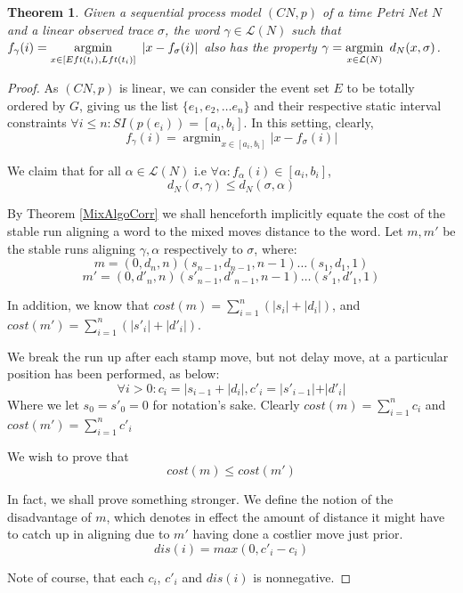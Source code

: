 \documentclass[conference]{IEEEtran}
\DeclareMathOperator*{\argmin}{argmin}
\newtheorem*{theorem*}{Theorem}
\begin{document}
\begin{theorem*}
	Given a sequential process model $(CN, p)$ of a time Petri Net $N$ and a linear observed trace $\sigma$, the word $\gamma \in \mathcal{L}(N)$ such that $f_{\gamma}(i)= \underset{x \in [Eft(t_i), Lft(t_i)]} {\argmin}\hspace{0.5em} {|x - f_\sigma(i)|}$ also has the property $\gamma = \underset{x \in \mathcal{L}(N)}{\argmin} \hspace{0.5em}{d_N(x, \sigma)}$. 
\end{theorem*}
\begin{proof}
As $(CN, p)$ is linear, we can consider the event set $E$ to be totally ordered by $G$, giving us the list $\{e_1, e_2, \dots e_n\}$ and their respective static interval constraints $\forall i \leq n : SI(p(e_i)) = [a_i, b_i]$. In this setting, clearly, $$f_{\gamma}(i)= \argmin_{x \in [a_i, b_i]} {|x - f_\sigma(i)|}$$

We claim that for all $\alpha \in \mathcal{L}(N)$ i.e $\forall \alpha : f_{\alpha}(i) \in [a_i, b_i]$, $$d_N(\sigma, \gamma) \leq d_N(\sigma, \alpha)$$

By Theorem \ref{MixAlgoCorr} we shall henceforth implicitly equate the cost of the stable run aligning a word to the mixed moves distance to the word. 
Let $m, m'$ be the stable runs aligning $\gamma, \alpha$ respectively to $\sigma$, where: 
$$m = (0, d_n, n)(s_{n-1}, d_{n-1}, n-1) \dots (s_1, d_1, 1)$$  
$$m' = (0, d'_n, n)(s'_{n-1}, d'_{n-1}, n-1) \dots (s'_1, d'_1, 1)$$ 

In addition, we know that $cost(m) = \sum_{i = 1}^{n} (|s_i| + |d_i|)$, and $cost(m') = \sum_{i = 1}^{n} (|s'_i| + |d'_i|)$. 

We break the run up after each stamp move, but not delay move, at a particular position has been performed, as below: $$\forall i > 0 : c_i = |s_{i-1} + |d_i|, c'_i = |s'_{i-1}| + |d'_i|$$ Where we let $s_0 = s'_0 = 0$ for notation's sake. Clearly $cost(m) = \sum_{i = 1}^{n} c_i$ and $cost(m') = \sum_{i = 1}^{n} c'_i$

We wish to prove that $$cost(m) \leq cost(m')$$ 

In fact, we shall prove something stronger. We define the notion of the disadvantage of $m$, which denotes in effect the amount of distance it might have to catch up in aligning due to $m'$ having done a costlier move just prior. $$dis(i) = max(0, c'_i - c_i)$$

Note of course, that each $c_i$, $c'_i$ and $dis(i)$ is nonnegative. 


\end{proof}
\end{document}
